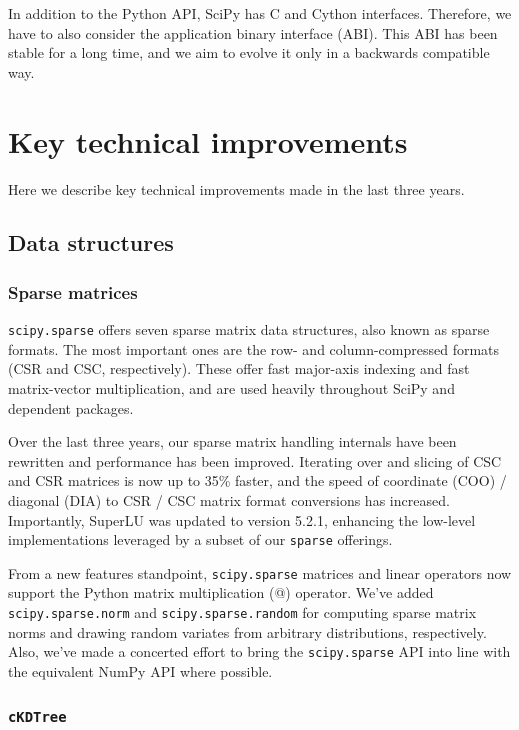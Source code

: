 \documentclass[fleqn,10pt]{wlscirep}
\begin{document}
In addition to the Python API, SciPy has C and Cython interfaces.
Therefore, we have to also consider the application binary
interface (ABI). This ABI has been stable for a long time, and we aim to
evolve it only in a backwards compatible way.

\section*{Key technical improvements}
\label{sec:technical_improvements}
Here we describe key technical improvements made in the last three years.

\subsection*{Data structures}

\subsubsection*{Sparse matrices}

\texttt{scipy.sparse} offers seven sparse matrix data structures,
also known as sparse formats. The most important ones are the row- 
and column-compressed formats (CSR and CSC, respectively). 
These offer fast major-axis indexing and fast matrix-vector multiplication,
and are used heavily throughout SciPy and dependent packages.

Over the last three years, our sparse matrix handling internals have been
rewritten and performance has been improved. Iterating over and slicing of CSC
and CSR matrices is now up to 35\% faster, %
and the speed of coordinate (COO) / diagonal (DIA) to CSR / CSC matrix format
conversions has increased. %
Importantly,
SuperLU\cite{superlu_ug99} was updated to version 5.2.1, enhancing the
low-level implementations leveraged by a subset of our \texttt{sparse}
offerings.

From a new features standpoint, \texttt{scipy.sparse} matrices and linear
operators now support the Python matrix multiplication (@) operator.
We've added \texttt{scipy.sparse.norm} and
\texttt{scipy.sparse.random} for computing sparse matrix norms and drawing
random variates from arbitrary distributions, respectively. Also, we've made a
concerted effort to bring the \texttt{scipy.sparse} API into line with the
equivalent NumPy API where possible.

\subsubsection*{\texttt{cKDTree}}
\end{document}
